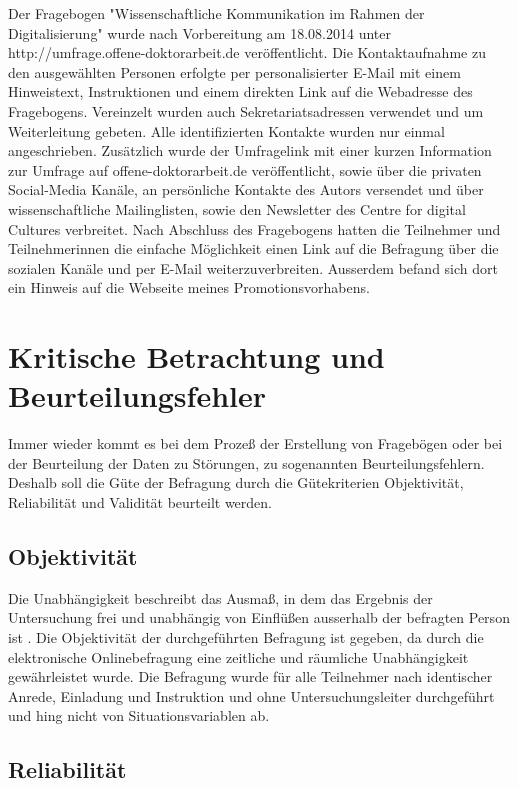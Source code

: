 Der Fragebogen "Wissenschaftliche Kommunikation im Rahmen der Digitalisierung" wurde nach Vorbereitung am 18.08.2014 unter http://umfrage.offene-doktorarbeit.de veröffentlicht. Die Kontaktaufnahme zu den ausgewählten Personen erfolgte per personalisierter E-Mail mit einem Hinweistext, Instruktionen und einem direkten Link auf die Webadresse des Fragebogens. Vereinzelt wurden auch Sekretariatsadressen verwendet und um Weiterleitung gebeten. Alle identifizierten Kontakte wurden nur einmal angeschrieben. Zusätzlich wurde der Umfragelink mit einer kurzen Information zur Umfrage auf offene-doktorarbeit.de veröffentlicht, sowie über die privaten Social-Media Kanäle, an persönliche Kontakte des Autors versendet und über wissenschaftliche Mailinglisten, sowie den Newsletter des Centre for digital Cultures verbreitet. Nach Abschluss des Fragebogens hatten die Teilnehmer und Teilnehmerinnen die einfache Möglichkeit einen Link auf die Befragung  über die sozialen Kanäle und per E-Mail weiterzuverbreiten. Ausserdem befand sich dort ein Hinweis auf die Webseite meines Promotionsvorhabens.

\section{Kritische Betrachtung und Beurteilungsfehler}

Immer wieder kommt es bei dem Prozeß der Erstellung von Fragebögen oder bei der Beurteilung der Daten zu Störungen, zu sogenannten Beurteilungsfehlern. Deshalb soll die Güte der Befragung durch
die Gütekriterien Objektivität, Reliabilität und Validität beurteilt werden.

\subsection{Objektivität}

Die Unabhängigkeit beschreibt das Ausmaß, in dem das Ergebnis der Untersuchung frei und unabhängig von Einflüßen ausserhalb der befragten Person ist \cite{rost_2004_lehrbuch}. Die Objektivität der durchgeführten Befragung ist gegeben, da durch die elektronische Onlinebefragung eine zeitliche und räumliche Unabhängigkeit gewährleistet wurde. Die Befragung wurde für alle Teilnehmer nach identischer Anrede, Einladung und Instruktion und ohne Untersuchungsleiter durchgeführt und hing nicht von Situationsvariablen ab.

\subsection{Reliabilität}

